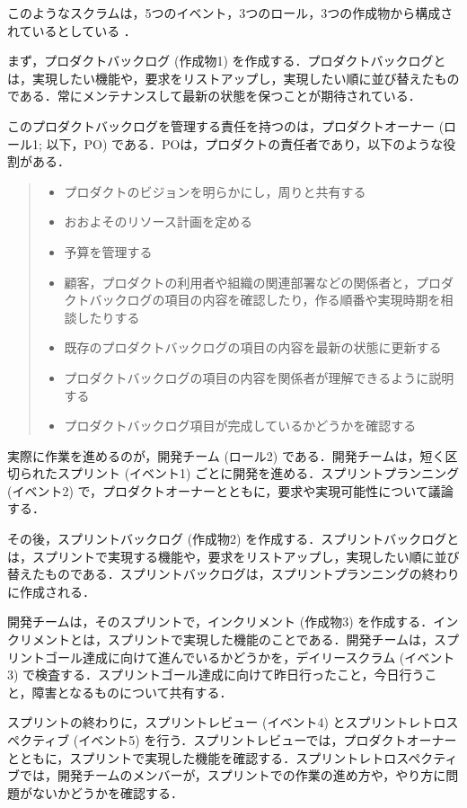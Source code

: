 このようなスクラムは，5つのイベント，3つのロール，3つの作成物から構成されているとしている \cite{scrum}．

まず，プロダクトバックログ (作成物1) を作成する．プロダクトバックログとは，実現したい機能や，要求をリストアップし，実現したい順に並び替えたものである．常にメンテナンスして最新の状態を保つことが期待されている．

このプロダクトバックログを管理する責任を持つのは，プロダクトオーナー (ロール1; 以下，PO) である．POは，プロダクトの責任者であり，以下のような役割がある．
\begin{quote}
    \begin{itemize}
        \item プロダクトのビジョンを明らかにし，周りと共有する
        \item おおよそのリソース計画を定める
        \item 予算を管理する
        \item 顧客，プロダクトの利用者や組織の関連部署などの関係者と，プロダクトバックログの項目の内容を確認したり，作る順番や実現時期を相談したりする
        \item 既存のプロダクトバックログの項目の内容を最新の状態に更新する
        \item プロダクトバックログの項目の内容を関係者が理解できるように説明する
        \item プロダクトバックログ項目が完成しているかどうかを確認する
    \end{itemize}
\end{quote}

実際に作業を進めるのが，開発チーム (ロール2) である．開発チームは，短く区切られたスプリント (イベント1) ごとに開発を進める．スプリントプランニング (イベント2) で，プロダクトオーナーとともに，要求や実現可能性について議論する．

その後，スプリントバックログ (作成物2) を作成する．スプリントバックログとは，スプリントで実現する機能や，要求をリストアップし，実現したい順に並び替えたものである．スプリントバックログは，スプリントプランニングの終わりに作成される．

開発チームは，そのスプリントで，インクリメント (作成物3) を作成する．インクリメントとは，スプリントで実現した機能のことである．開発チームは，スプリントゴール達成に向けて進んでいるかどうかを，デイリースクラム (イベント3) で検査する．スプリントゴール達成に向けて昨日行ったこと，今日行うこと，障害となるものについて共有する．

スプリントの終わりに，スプリントレビュー (イベント4) とスプリントレトロスペクティブ (イベント5) を行う．スプリントレビューでは，プロダクトオーナーとともに，スプリントで実現した機能を確認する．スプリントレトロスペクティブでは，開発チームのメンバーが，スプリントでの作業の進め方や，やり方に問題がないかどうかを確認する．

